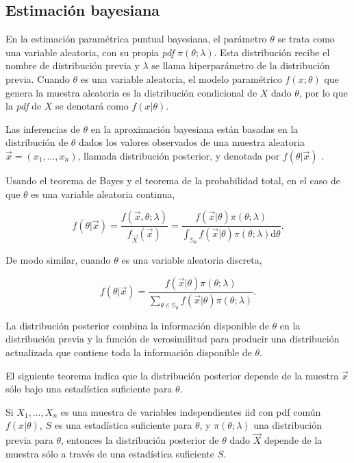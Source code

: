 		\subsection{Estimación bayesiana}
		
		En la estimación paramétrica puntual bayesiana, el parámetro $\theta$ se trata como una variable aleatoria, con su propia \textit{pdf} $\pi(\theta;\lambda)$. Esta distribución recibe el nombre de distribución previa y $\lambda$ se llama hiperparámetro de la distribución previa. Cuando $\theta$ es una variable aleatoria, el modelo paramétrico $f(x;\theta)$ que genera la muestra aleatoria es la distribución condicional de $X$ dado $\theta$, por lo que la \textit{pdf} de $X$ se denotará como $f(x|\theta)$. 
		
		Las inferencias de $\theta$ en la aproximación bayesiana están basadas en la distribución de $\theta$ dados los valores observados de una muestra aleatoria $\vec{x}=(x_1,\dots,x_n)$, llamada distribución posterior, y denotada por $f(\theta | \vec{x})$ \cite{rossi_2018}. 		
		
		Usando el teorema de Bayes y el teorema de la probabilidad total, en el caso de que $\theta$ es una variable aleatoria continua,
		
		$$f(\theta | \vec{x})=\frac{f(\vec{x},\theta;\lambda)}{f_{\vec{X}}(\vec{x})}=\frac{f(\vec{x}|\theta)\pi(\theta;\lambda)}{\int_{\mathbb{S}_\theta}f(\vec{x}|\theta)\pi(\theta;\lambda)\mathrm{d}\theta}.$$
		
		De modo similar, cuando $\theta$ es una variable aleatoria discreta,
		
		$$f(\theta|\vec{x})=\frac{f(\vec{x}|\theta)\pi(\theta;\lambda)}{\sum_{\theta\in\mathbb{S}_\theta}f(\vec{x}|\theta)\pi(\theta;\lambda)}.$$
		
		La distribución posterior combina la información disponible de $\theta$ en la distribución previa y la función de verosimilitud para producir una distribución actualizada que contiene toda la información disponible de $\theta$.
		
		El siguiente teorema indica que la distribución posterior depende de la muestra $\vec{x}$ sólo bajo una estadística suficiente para $\theta$.
		
		\begin{theo}
			Si $X_1,\dots,X_n$ es una muestra de variables independientes iid con pdf común $f(x|\theta)$, $S$ es una estadística suficiente para $\theta$, y $\pi(\theta;\lambda)$ una distribución previa para $\theta$, entonces la distribución posterior de $\theta$ dado $\vec{X}$ depende de la muestra sólo a través de una estadística suficiente $S$.
		\end{theo}
		
